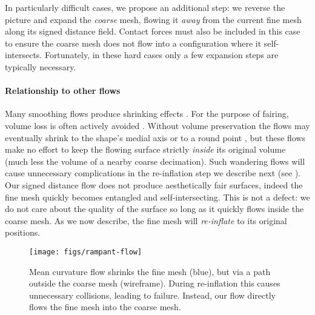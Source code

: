 
In particularly difficult cases, we propose an additional step: we reverse the picture and
expand the \emph{coarse} mesh, flowing it \emph{away} from the current fine mesh along its
signed distance field. Contact forces must also be included in this case to ensure the coarse mesh does
not flow into a configuration where it self-intersects. Fortunately, in these hard cases only a few expansion steps are typically necessary.


\paragraph{Relationship to other flows}
%
Many smoothing flows produce shrinking effects
\cite{Taubin:1995,desbrun99implicitfairing,Crane:2013:RFV}. For the purpose of
fairing, volume loss is often actively avoided \cite{desbrun99implicitfairing}.
%
Without volume preservation the flows may eventually shrink to the shape's
medial axis \cite{Wang:2008,Au:2008,Tagliasacchi:2012:MCS} or to a round point
\cite{Kazhdan2012}, but these flows make no effort to keep the flowing surface
strictly \emph{inside} its original volume (much less the volume of a nearby
coarse decimation). Such wandering flows will cause unnecessary complications
in the re-inflation step we describe next (see ).
%
Our signed distance flow does not produce aesthetically fair surfaces, indeed
the fine mesh quickly becomes entangled and self-intersecting. This is not a defect: we do not care about the quality of the surface so long as it quickly
flows inside the coarse mesh. As we now describe, the fine mesh will
\emph{re-inflate} to its original positions.

\begin{figure*}
  \texttt{[image: figs/rampant-flow]}
  \caption{Mean curvature flow \protect\cite{Kazhdan2012} shrinks the fine mesh
  (blue), but via a path outside the coarse mesh (wireframe).  During
  re-inflation this causes unnecessary collisions, leading to failure.
  Instead, our flow directly flows the fine mesh into the coarse mesh.}
  \label{fig:rampant-flow}
\end{figure*}

